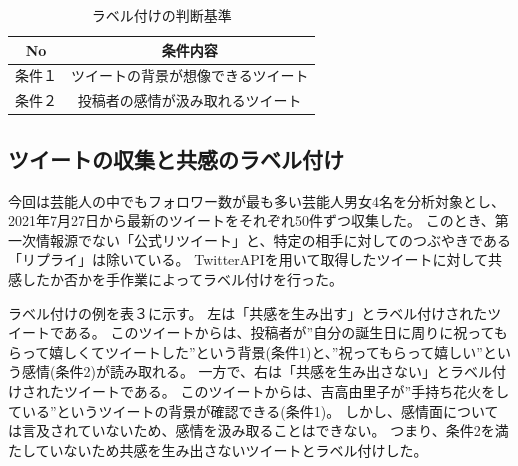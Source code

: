 \documentclass[dvipdfmx]{issj}
\begin{document}
\begin{table}[t]\centering
\caption{ラベル付けの判断基準}\label{tbl:font}
\begin{small}
\begin{tabular}{|c|c|} \hline
No   & 条件内容\\\hline\hline
条件１& ツイートの背景が想像できるツイート\\\hline
条件２ & 投稿者の感情が汲み取れるツイート\\\hline
\end{tabular}
\end{small}
\end{table}


\subsection{ツイートの収集と共感のラベル付け }  %
今回は芸能人の中でもフォロワー数が最も多い芸能人男女4名を分析対象とし、2021年7月27日から最新のツイートをそれぞれ50件ずつ収集した。
このとき、第一次情報源でない「公式リツイート」と、特定の相手に対してのつぶやきである「リプライ」は除いている。
TwitterAPIを用いて取得したツイートに対して共感したか否かを手作業によってラベル付けを行った。


ラベル付けの例を表３に示す。
左は「共感を生み出す」とラベル付けされたツイートである。
このツイートからは、投稿者が”自分の誕生日に周りに祝ってもらって嬉しくてツイートした”という背景(条件1)と、”祝ってもらって嬉しい”という感情(条件2)が読み取れる。
一方で、右は「共感を生み出さない」とラベル付けされたツイートである。
このツイートからは、吉高由里子が”手持ち花火をしている”というツイートの背景が確認できる(条件1)。
しかし、感情面については言及されていないため、感情を汲み取ることはできない。
つまり、条件2を満たしていないため共感を生み出さないツイートとラベル付けした。
\end{document}
